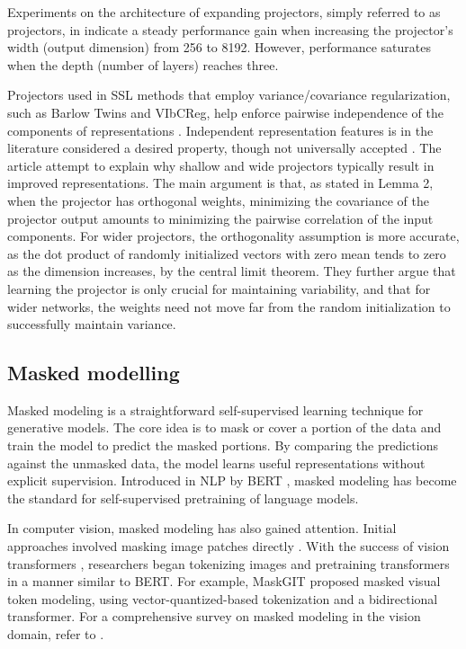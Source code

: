 \documentclass[../../thesis.tex]{subfiles}
\begin{document}
Experiments on the architecture of expanding projectors, simply referred to as projectors, in \cite{zbontar2021barlow,bardes2022vicreg} indicate a steady performance gain when increasing the projector's width (output dimension) from 256 to 8192. However, performance saturates when the depth (number of layers) reaches three.\newline

Projectors used in SSL methods that employ variance/covariance regularization, such as Barlow Twins and VIbCReg, help enforce pairwise independence of the components of representations \cite{mialon2024variance}. Independent representation features is in the literature considered a desired property, though not universally accepted \cite{träuble2021disentangled,Rep-rev-persp}. The article \cite{mialon2024variance} attempt to explain why shallow and wide projectors typically result in improved representations. The main argument is that, as stated in Lemma 2, when the projector has orthogonal weights, minimizing the covariance of the projector output amounts to minimizing the pairwise correlation of the input components. For wider projectors, the orthogonality assumption is more accurate, as the dot product of randomly initialized vectors with zero mean tends to zero as the dimension increases, by the central limit theorem. They further argue that learning the projector is only crucial for maintaining variability, and that for wider networks, the weights need not move far from the random initialization to successfully maintain variance.   

\subsection{Masked modelling}
\label{section:Masked modelling}
Masked modeling is a straightforward self-supervised learning technique for generative models. The core idea is to mask or cover a portion of the data and train the model to predict the masked portions. By comparing the predictions against the unmasked data, the model learns useful representations without explicit supervision. Introduced in NLP by BERT \cite{devlin2019bert}, masked modeling has become the standard for self-supervised pretraining of language models.\newline

In computer vision, masked modeling has also gained attention. Initial approaches involved masking image patches directly \cite{he2021masked}. With the success of vision transformers \cite{dosovitskiy2021image}, researchers began tokenizing images and pretraining transformers in a manner similar to BERT. For example, MaskGIT \cite{chang2022maskgit} proposed masked visual token modeling, using vector-quantized-based tokenization and a bidirectional transformer. For a comprehensive survey on masked modeling in the vision domain, refer to \cite{li2024masked}.
\end{document}
